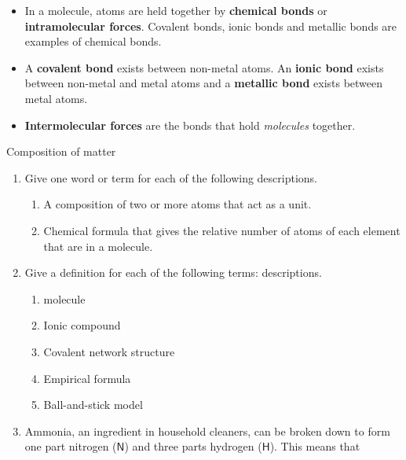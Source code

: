\begin{itemize}[noitemsep]
{model} is also a 3-dimensional molecular model. The atoms are 
represented by spheres.
\label{m38120*uid77}\item In a molecule, atoms are held together by \textbf{chemical bonds} or \textbf{intramolecular forces}. Covalent bonds, ionic bonds and 
metallic bonds are examples of chemical bonds.
\label{m38120*uid78}\item A \textbf{covalent bond} 
exists between non-metal atoms. An \textbf{ionic bond} 
exists between non-metal and metal atoms and a \textbf{metallic 
bond} exists between metal atoms.
\label{m38120*uid79}\item \textbf{Intermolecular 
forces} are the bonds that hold \textsl{molecules} together.
\end{itemize}
\label{m38120*secfhsst!!!underscore!!!id497}
            \begin{eocexercises}{Composition of matter}
            \nopagebreak
            \label{m38120*id311490}\begin{enumerate}[noitemsep, label=\textbf{\arabic*}. ] 
            \label{m38120*uid87}\item Give one word or term for each of the following 
descriptions.
\label{m38120*id34411506}\begin{enumerate}[noitemsep, label=\textbf{\alph*}. ] 
            \label{m38120*uid90}\item A composition of two or more atoms that act as a unit.
\label{m38120*uid9221}\item Chemical formula that gives the relative number of atoms 
of each element that are in a molecule.
\end{enumerate}
\label{m38120*uid227}\item Give a definition for each of the following terms: 
descriptions.
\label{m38120*id311506}\begin{enumerate}[noitemsep, label=\textbf{\alph*}. ] 
            \label{m38120*uid930}\item molecule
\label{m38120*uid91}\item Ionic compound
\item Covalent network structure\item Empirical formula\item Ball-and-stick model\end{enumerate}
\label{m38120*uid92}\item Ammonia, an ingredient in household cleaners, can be broken down to 
form one part nitrogen ($\mathsf{N}$) and three parts hydrogen ($\mathsf{H}$). This means that 

\end{enumerate}
\end{eocexercises}
